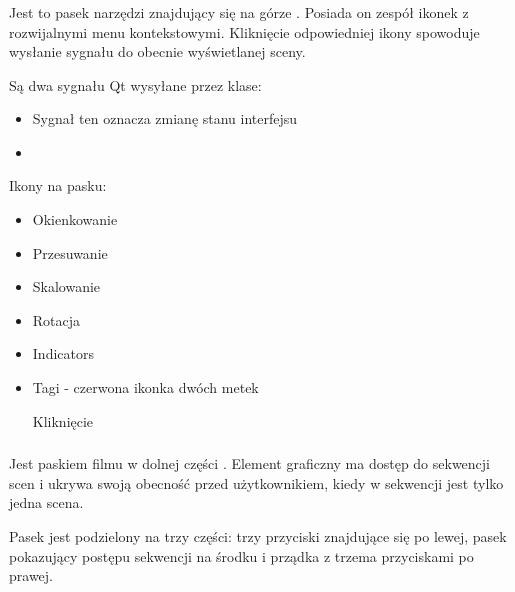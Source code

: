 \subsubsection{}
\label{sec:sokar-dicomtoolbar}

Jest to pasek narzędzi znajdujący się na górze .
Posiada on zespół ikonek z rozwijalnymi menu kontekstowymi.
Kliknięcie odpowiedniej ikony spowoduje wysłanie sygnału do obecnie wyświetlanej sceny.

Są dwa sygnału Qt wysyłane przez klase:
\begin{itemize}
    \item {}

          Sygnał ten oznacza zmianę stanu interfejsu

    \item {}
\end{itemize}


Ikony na pasku:
\begin{itemize}
    \item Okienkowanie
    \item Przesuwanie
    \item Skalowanie
    \item Rotacja
    \item Indicators
    \item Tagi - czerwona ikonka dwóch metek

          Kliknięcie
\end{itemize}

\subsubsection{}
\label{sec:sokar-dicomgraphics}

\subsubsection{}
\label{sec:sokar-moviebar}

\par
Jest paskiem filmu w dolnej części .
Element graficzny ma dostęp do sekwencji scen i ukrywa swoją obecność przed użytkownikiem, kiedy w sekwencji jest tylko jedna scena.

\par
Pasek jest podzielony na trzy części: trzy przyciski znajdujące się po lewej, pasek pokazujący postępu sekwencji na środku i prządka z trzema przyciskami po prawej.

